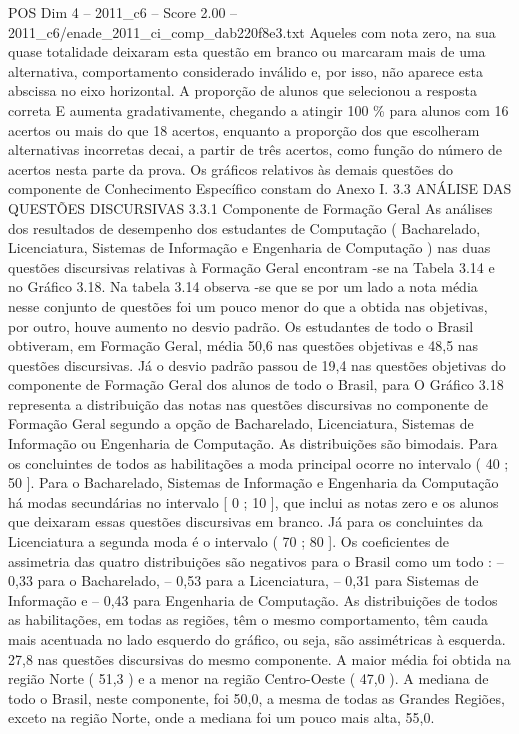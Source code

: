 \begin{textsample}{POS Dim 4 – 2011\_c6 – Score 2.00 – 2011\_c6/enade\_2011\_ci\_comp\_dab220f8e3.txt}
Aqueles com nota zero, na sua quase totalidade deixaram esta questão em branco ou marcaram mais de uma alternativa, comportamento considerado inválido e, por isso, não aparece esta abscissa no eixo horizontal.
A proporção de alunos que selecionou a resposta correta E aumenta gradativamente, chegando a atingir 100 \% para alunos com 16 acertos ou mais do que 18 acertos, enquanto a proporção dos que escolheram alternativas incorretas decai, a partir de três acertos, como função do número de acertos nesta parte da prova.
Os gráficos relativos às demais questões do componente de Conhecimento Específico constam do Anexo I. 3.3 ANÁLISE DAS QUESTÕES DISCURSIVAS 3.3.1 Componente de Formação Geral As análises dos resultados de desempenho dos estudantes de Computação ( Bacharelado, Licenciatura, Sistemas de Informação e Engenharia de Computação ) nas duas questões discursivas relativas à Formação Geral encontram -se na Tabela 3.14 e no Gráfico 3.18.
Na tabela 3.14 observa -se que se por um lado a nota média nesse conjunto de questões foi um pouco menor do que a obtida nas objetivas, por outro, houve aumento no desvio padrão.
Os estudantes de todo o Brasil obtiveram, em Formação Geral, média 50,6 nas questões objetivas e 48,5 nas questões discursivas.
Já o desvio padrão passou de 19,4 nas questões objetivas do componente de Formação Geral dos alunos de todo o Brasil, para O Gráfico 3.18 representa a distribuição das notas nas questões discursivas no componente de Formação Geral segundo a opção de Bacharelado, Licenciatura, Sistemas de Informação ou Engenharia de Computação.
As distribuições são bimodais.
Para os concluintes de todos as habilitações a moda principal ocorre no intervalo ( 40 ; 50 ].
Para o Bacharelado, Sistemas de Informação e Engenharia da Computação há modas secundárias no intervalo [ 0 ; 10 ], que inclui as notas zero e os alunos que deixaram essas questões discursivas em branco.
Já para os concluintes da Licenciatura a segunda moda é o intervalo ( 70 ; 80 ].
Os coeficientes de assimetria das quatro distribuições são negativos para o Brasil como um todo : – 0,33 para o Bacharelado, – 0,53 para a Licenciatura, – 0,31 para Sistemas de Informação e – 0,43 para Engenharia de Computação.
As distribuições de todos as habilitações, em todas as regiões, têm o mesmo comportamento, têm cauda mais acentuada no lado esquerdo do gráfico, ou seja, são assimétricas à esquerda. 27,8 nas questões discursivas do mesmo componente.
A maior média foi obtida na região Norte ( 51,3 ) e a menor na região Centro-Oeste ( 47,0 ).
A mediana de todo o Brasil, neste componente, foi 50,0, a mesma de todas as Grandes Regiões, exceto na região Norte, onde a mediana foi um pouco mais alta, 55,0.

\end{textsample}
